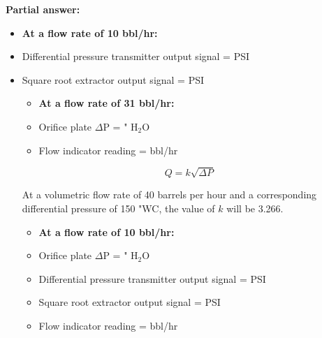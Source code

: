 





\noindent
{\bf Partial answer:}

\begin{itemize}
\item {} {\bf At a flow rate of 10 bbl/hr:}
\vskip 5pt
\item{} Differential pressure transmitter output signal =  PSI
\vskip 5pt
\item{} Square root extractor output signal =  PSI
\medskip

\vskip 10pt

\begin{itemize}
\item {} {\bf At a flow rate of 31 bbl/hr:}
\vskip 5pt
\item{} Orifice plate $\Delta$P =  " H$_{2}$O
\vskip 5pt
\item{} Flow indicator reading =  bbl/hr
\end{itemize}







$$Q = k \sqrt{\Delta P}$$

At a volumetric flow rate of 40 barrels per hour and a corresponding differential pressure of 150 "WC, the value of $k$ will be 3.266.

\begin{itemize}
\item {} {\bf At a flow rate of 10 bbl/hr:}
\vskip 5pt
\item{} Orifice plate $\Delta$P =  " H$_{2}$O
\vskip 5pt
\item{} Differential pressure transmitter output signal =  PSI
\vskip 5pt
\item{} Square root extractor output signal =  PSI
\vskip 5pt
\item{} Flow indicator reading =  bbl/hr
\end{itemize}


\end{itemize}
